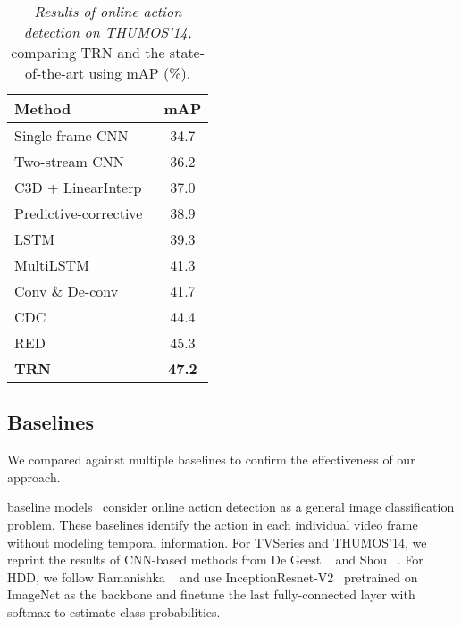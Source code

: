 \begin{table}[t]
    \centering
    \small
    \begin{tabular}
        {@{\quad}l@{\quad}@{\quad\;\;\;\;\;\;\;\;\;\;\;}c@{\quad}}
        \toprule
        Method & mAP \\
        \midrule
        {Single-frame CNN}~\cite{simonyan2014very} &34.7 \\
        {Two-stream CNN}~\cite{simonyan2014two} &36.2 \\
        {C3D + LinearInterp}~\cite{shou2017cdc} &37.0 \\
        {Predictive-corrective}~\cite{dave2017predictive} &38.9 \\
        {LSTM}~\cite{donahue2015long} &39.3 \\
        {MultiLSTM}~\cite{yeung2018every} &41.3\\
        {Conv \& De-conv}~\cite{shou2017cdc} &41.7\\
        {CDC}~\cite{shou2017cdc} &44.4 \\
        {RED~\cite{gao2017red}} &45.3 \\
        \midrule
        \textbf{TRN} &\textbf{47.2} \\
        \bottomrule
    \end{tabular}
    \vspace{-5pt}
    \caption{\textit{Results of online action detection on THUMOS'14,}
    comparing TRN and the state-of-the-art using mAP (\%).}
    \vspace{-10pt}
    \label{table:th_detection}
\end{table}

 

\subsection{Baselines}

We compared against multiple baselines to confirm the effectiveness
of our approach.

 baseline models~\cite{simonyan2014very,simonyan2014two} consider online action detection as a
general image classification problem. These
baselines identify the action
in each individual video frame without modeling
temporal information.
For TVSeries and THUMOS'14, we reprint
the results of
CNN-based methods from De Geest \etal~\cite{de2016online}
and Shou \etal~\cite{shou2017cdc}. For HDD, we follow
Ramanishka \etal~\cite{RamanishkaCVPR2018} and use
InceptionResnet-V2~\cite{szegedy2016inception} pretrained on ImageNet
as the backbone and finetune the last fully-connected layer
with softmax to estimate class probabilities.

